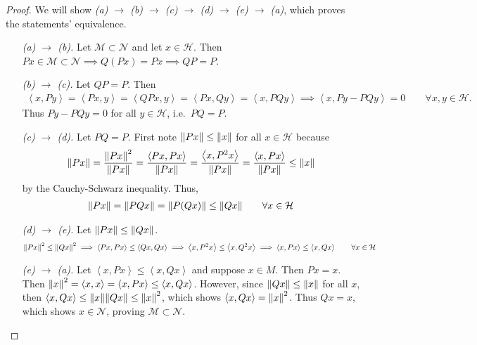 \documentclass{article} %
\theoremstyle{plain}
\newcommand{\VEC}[2]{\left\langle #1, #2 \right\rangle}
\numberwithin{equation}{section} %
\numberwithin{figure}{section} %
\numberwithin{table}{section} %
\begin{document}
\begin{proof}
    We will show \emph{(a) $\rightarrow$ (b) $\rightarrow$ (c) $\rightarrow$ (d) $\rightarrow$ (e) $\rightarrow$ (a)}, which proves the statements' equivalence.
    \begin{enumerate}
        \item[\it (a) $\rightarrow$ (b). ]
            Let $\mathcal{M} \subset \mathcal{N}$ and let $x \in \mathcal{H}$.  Then $Px \in \mathcal{M} \subset \mathcal{N} \implies Q(Px) = Px \implies QP = P$.
        \item[\it (b) $\rightarrow$ (c). ]
            Let $QP = P$.  Then
            \begin{align*}
                \VEC{x}{Py} = \VEC{Px}{y} = \VEC{QPx}{y} = \VEC{Px}{Qy} = \VEC{x}{PQy} \implies \VEC{x}{Py - PQy} = 0 \qquad \forall x, y \in \mathcal{H}.
            \end{align*}
            Thus $Py - PQy = 0$ for all $y \in \mathcal{H}$, i.e.~$PQ = P$.
        \item[\it (c) $\rightarrow$ (d). ]
            Let $PQ = P$.  First note $\norm{Px} \leq \norm{x}$ for all $x \in \mathcal{H}$ because
            \begin{align*}
                \norm{Px} = \frac{\norm{Px}^2}{\norm{Px}} = \frac{\VEC{Px}{Px}}{\norm{Px}} = \frac{\VEC{x}{P^2x}}{\norm{Px}} = \frac{\VEC{x}{Px}}{\norm{Px}} \leq \norm{x}
            \end{align*}
            by the Cauchy-Schwarz inequality.  Thus,
            \begin{align*}
                \norm{Px} = \norm{PQx} = \norm{P(Qx)} \leq \norm{Qx} \qquad \forall x \in \mathcal{H}
            \end{align*}
        \item[\it (d) $\rightarrow$ (e). ]
            Let $\norm{Px} \leq \norm{Qx}$.
            \begin{align*}
                \norm{Px}^2 \leq \norm{Qx}^2 \implies \VEC{Px}{Px} \leq \VEC{Qx}{Qx} \implies \VEC{x}{P^2x} \leq \VEC{x}{Q^2x} \implies \VEC{x}{Px} \leq \VEC{x}{Qx} \qquad \forall x \in \mathcal{H}
            \end{align*}
        \item[\it (e) $\rightarrow$ (a). ]
            Let $\VEC{x}{Px} \leq \VEC{x}{Qx}$ and suppose $x \in M$.  Then $Px = x$.  Then $\norm{x}^2 = \VEC{x}{x} = \VEC{x}{Px} \leq \VEC{x}{Qx}$.  However, since $\norm{Qx} \leq \norm{x}$ for all $x$, then $\VEC{x}{Qx} \leq \norm{x}\norm{Qx} \leq \norm{x}^2$, which shows $\VEC{x}{Qx} = \norm{x}^2$.  Thus $Qx = x$, which shows $x \in \mathcal{N}$, proving $\mathcal{M} \subset \mathcal{N}$.
    \end{enumerate}
\end{proof}
\end{document}
